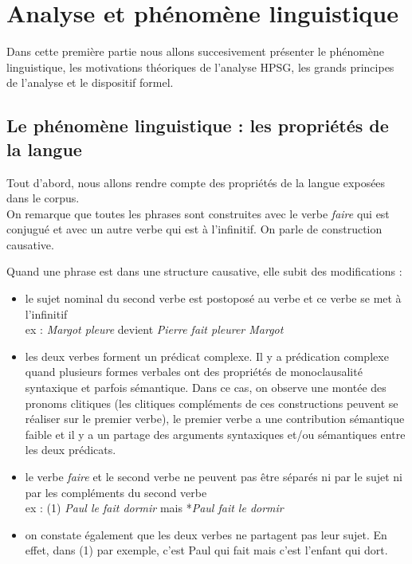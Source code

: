 %

\section {Analyse et phénomène linguistique}

Dans cette première partie nous allons succesivement présenter le phénomène linguistique, les motivations théoriques de l'analyse HPSG, les grands principes de l'analyse et le dispositif formel.

\newpage

\subsection{Le phénomène linguistique : les propriétés de la langue}

Tout d'abord, nous allons rendre compte des propriétés de la langue exposées dans le corpus.\\

On remarque que toutes les phrases sont construites avec le verbe \emph{faire} qui est conjugué et avec un autre verbe qui est à l'infinitif.
On parle de construction causative.

Quand une phrase est dans une structure causative, elle subit des modifications : \\

\begin{itemize}
  \item le sujet nominal du second verbe est postoposé au verbe et ce verbe se met à l'infinitif\\
    ex : \emph{Margot pleure} devient \emph{Pierre fait pleurer Margot}
  \item les deux verbes forment un prédicat complexe.
    Il y a prédication complexe quand plusieurs formes verbales ont des	propriétés de monoclausalité syntaxique et parfois sémantique.
    Dans ce cas, on observe une montée des pronoms clitiques (les clitiques compléments de ces constructions peuvent se réaliser sur le premier verbe), le premier verbe a une contribution sémantique faible et il y a un partage des arguments syntaxiques et/ou sémantiques entre les deux prédicats.
  \item le verbe \emph{faire} et le second verbe ne peuvent pas être séparés ni par le sujet ni par les compléments du second verbe\\
    ex : (1) \emph{Paul le fait dormir} mais *\emph{Paul fait le dormir}
  \item on constate également que les deux verbes ne partagent pas leur sujet.
    En effet, dans (1) par exemple, c'est Paul qui fait mais c'est l'enfant qui dort.
\end{itemize}~{}\\

